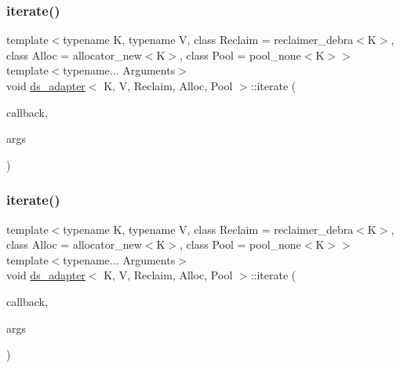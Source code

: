 \subsubsection{\texorpdfstring{iterate()}{iterate()}\hspace{0.1cm}{\footnotesize\ttfamily [4/5]}}
{\footnotesize\ttfamily template$<$typename K, typename V, class Reclaim = reclaimer\+\_\+debra$<$\+K$>$, class Alloc = allocator\+\_\+new$<$\+K$>$, class Pool = pool\+\_\+none$<$\+K$>$$>$ \\
template$<$typename... Arguments$>$ \\
void \hyperlink{classds__adapter}{ds\+\_\+adapter}$<$ K, V, Reclaim, Alloc, Pool $>$\+::iterate (\begin{DoxyParamCaption}\item[{void($\ast$)(K key, V value, Arguments... args)}]{callback,  }\item[{Arguments...}]{args }\end{DoxyParamCaption})\hspace{0.3cm}{\ttfamily [inline]}}

\mbox{\label{classds__adapter_ab1e0bb9a9b403ba68e85bf53219b1368}} 
\subsubsection{\texorpdfstring{iterate()}{iterate()}\hspace{0.1cm}{\footnotesize\ttfamily [5/5]}}
{\footnotesize\ttfamily template$<$typename K, typename V, class Reclaim = reclaimer\+\_\+debra$<$\+K$>$, class Alloc = allocator\+\_\+new$<$\+K$>$, class Pool = pool\+\_\+none$<$\+K$>$$>$ \\
template$<$typename... Arguments$>$ \\
void \hyperlink{classds__adapter}{ds\+\_\+adapter}$<$ K, V, Reclaim, Alloc, Pool $>$\+::iterate (\begin{DoxyParamCaption}\item[{void($\ast$)(K key, V value, Arguments... args)}]{callback,  }\item[{Arguments...}]{args }\end{DoxyParamCaption})\hspace{0.3cm}{\ttfamily [inline]}}

\mbox{\label{classds__adapter_a33b13b7059a8c0345fb59a324dc3a691}} 
